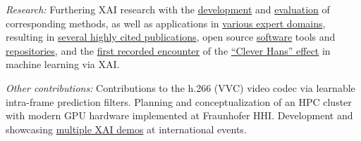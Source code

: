 {{{{                \emph{Research:}
                Furthering XAI research with the
                \href{https://scholar.google.com/citations?view_op=view_citation&hl=de&user=wpLQuroAAAAJ&citation_for_view=wpLQuroAAAAJ:u-x6o8ySG0sC}{development} and
                \href{https://scholar.google.com/citations?view_op=view_citation&hl=de&user=wpLQuroAAAAJ&citation_for_view=wpLQuroAAAAJ:u5HHmVD_uO8C}{evaluation} of corresponding methods,
                as well as applications in
                \href{https://scholar.google.com/citations?view_op=view_citation&hl=de&user=wpLQuroAAAAJ&citation_for_view=wpLQuroAAAAJ:9yKSN-GCB0IC}{various expert domains},
                resulting in
                \href{https://scholar.google.com/citations?user=wpLQuroAAAAJ}{several highly cited publications},
                open source
                \href{https://scholar.google.com/citations?view_op=view_citation&hl=de&user=wpLQuroAAAAJ&citation_for_view=wpLQuroAAAAJ:2osOgNQ5qMEC}{software}
                tools and
                \href{https://github.com/sebastian-lapuschkin/lrp_toolbox}{repositories},
                and the \href{https://scholar.google.com/citations?view_op=view_citation&hl=de&user=wpLQuroAAAAJ&citation_for_view=wpLQuroAAAAJ:d1gkVwhDpl0C}{first recorded encounter} of the
                \href{https://scholar.google.com/citations?view_op=view_citation&citation_for_view=wpLQuroAAAAJ:5nxA0vEk-isC}{``Clever Hans'' effect}
                in machine learning via XAI.

                \vstep

                \emph{Other contributions:}
                Contributions to the h.266 (VVC) video codec via learnable intra-frame prediction filters.
                Planning and conceptualization of an HPC cluster with modern GPU hardware implemented at Fraunhofer HHI.
                Development and showcasing
                \href{https://lrpserver.hhi.fraunhofer.de/}{multiple XAI demos}
                at international events.

                \vstep
                }
            \fi


        }
    }
}


